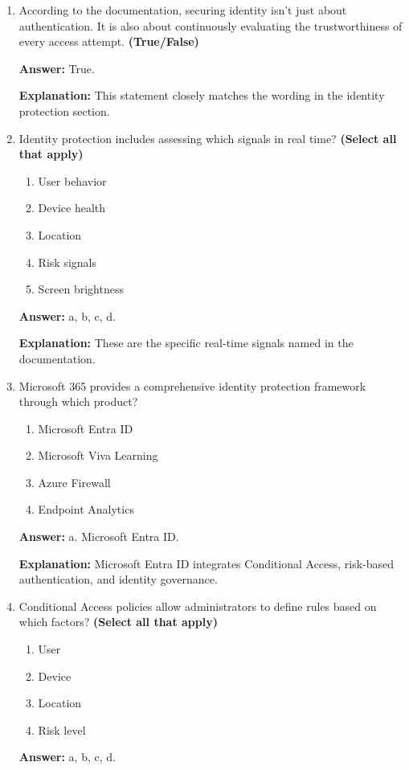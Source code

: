 \documentclass[10pt]{article}
\begin{document}
\begin{enumerate}[leftmargin=*]
\textbf{Explanation:} early identity protection lays the groundwork for securing the remaining pillars while supporting agility and compliance.

\item According to the documentation, securing identity isn’t just about authentication. It is also about continuously evaluating the trustworthiness of every access attempt. \textbf{(True/False)}

\textbf{Answer:} True.

\textbf{Explanation:} This statement closely matches the wording in the identity protection section.

\item Identity protection includes assessing which signals in real time? \textbf{(Select all that apply)}
\begin{enumerate}[label=\alph*., leftmargin=1.5em]
\item User behavior
\item Device health
\item Location
\item Risk signals
\item Screen brightness
\end{enumerate}
\textbf{Answer:} a, b, c, d.

\textbf{Explanation:} These are the specific real-time signals named in the documentation.

\item Microsoft 365 provides a comprehensive identity protection framework through which product?
\begin{enumerate}[label=\alph*., leftmargin=1.5em]
\item Microsoft Entra ID
\item Microsoft Viva Learning
\item Azure Firewall
\item Endpoint Analytics
\end{enumerate}
\textbf{Answer:} a. Microsoft Entra ID.

\textbf{Explanation:} Microsoft Entra ID integrates Conditional Access, risk-based authentication, and identity governance.

\item Conditional Access policies allow administrators to define rules based on which factors? \textbf{(Select all that apply)}
\begin{enumerate}[label=\alph*., leftmargin=1.5em]
\item User
\item Device
\item Location
\item Risk level
\end{enumerate}
\textbf{Answer:} a, b, c, d.


\end{enumerate}
\end{document}
